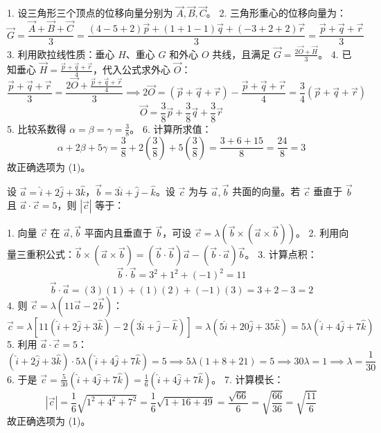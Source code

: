 \begin{questions}
\begin{solution}
1. 设三角形三个顶点的位移向量分别为 $\vec{A}, \vec{B}, \vec{C}$。
2. 三角形重心的位移向量为：
\[
\vec{G} = \frac{\vec{A} + \vec{B} + \vec{C}}{3} = \frac{(4-5+2)\vec{p} + (1+1-1)\vec{q} + (-3+2+2)\vec{r}}{3} = \frac{\vec{p} + \vec{q} + \vec{r}}{3}
\]
3. 利用欧拉线性质：垂心 $H$、重心 $G$ 和外心 $O$ 共线，且满足 $\vec{G} = \frac{2\vec{O} + \vec{H}}{3}$。
4. 已知垂心 $\vec{H} = \frac{\vec{p}+\vec{q}+\vec{r}}{4}$，代入公式求外心 $\vec{O}$：
\[
\frac{\vec{p} + \vec{q} + \vec{r}}{3} = \frac{2\vec{O} + \frac{\vec{p}+\vec{q}+\vec{r}}{4}}{3} \implies 2\vec{O} = (\vec{p}+\vec{q}+\vec{r}) - \frac{\vec{p}+\vec{q}+\vec{r}}{4} = \frac{3}{4}(\vec{p}+\vec{q}+\vec{r})
\]
\[
\vec{O} = \frac{3}{8}\vec{p} + \frac{3}{8}\vec{q} + \frac{3}{8}\vec{r}
\]
5. 比较系数得 $\alpha = \beta = \gamma = \frac{3}{8}$。
6. 计算所求值：
\[
\alpha + 2\beta + 5\gamma = \frac{3}{8} + 2\left(\frac{3}{8}\right) + 5\left(\frac{3}{8}\right) = \frac{3 + 6 + 15}{8} = \frac{24}{8} = 3
\]
故正确选项为 (1)。
\end{solution}

\question
设 $\vec{a} = \hat{i} + 2\hat{j} + 3\hat{k}$，$\vec{b} = 3\hat{i} + \hat{j} - \hat{k}$。设 $\vec{c}$ 为与 $\vec{a}, \vec{b}$ 共面的向量。若 $\vec{c}$ 垂直于 $\vec{b}$ 且 $\vec{a} \cdot \vec{c} = 5$，则 $|\vec{c}|$ 等于：

\begin{solution}
1. 向量 $\vec{c}$ 在 $\vec{a}, \vec{b}$ 平面内且垂直于 $\vec{b}$，可设 $\vec{c} = \lambda (\vec{b} \times (\vec{a} \times \vec{b}))$。
2. 利用向量三重积公式：$\vec{b} \times (\vec{a} \times \vec{b}) = (\vec{b} \cdot \vec{b})\vec{a} - (\vec{b} \cdot \vec{a})\vec{b}$。
3. 计算点积：
\[
\vec{b} \cdot \vec{b} = 3^2 + 1^2 + (-1)^2 = 11
\]
\[
\vec{b} \cdot \vec{a} = (3)(1) + (1)(2) + (-1)(3) = 3 + 2 - 3 = 2
\]
4. 则 $\vec{c} = \lambda (11\vec{a} - 2\vec{b})$：
\[
\vec{c} = \lambda [11(\hat{i} + 2\hat{j} + 3\hat{k}) - 2(3\hat{i} + \hat{j} - \hat{k})] = \lambda (5\hat{i} + 20\hat{j} + 35\hat{k}) = 5\lambda (\hat{i} + 4\hat{j} + 7\hat{k})
\]
5. 利用 $\vec{a} \cdot \vec{c} = 5$：
\[
(\hat{i} + 2\hat{j} + 3\hat{k}) \cdot 5\lambda (\hat{i} + 4\hat{j} + 7\hat{k}) = 5 \implies 5\lambda (1 + 8 + 21) = 5 \implies 30\lambda = 1 \implies \lambda = \frac{1}{30}
\]
6. 于是 $\vec{c} = \frac{5}{30}(\hat{i} + 4\hat{j} + 7\hat{k}) = \frac{1}{6}(\hat{i} + 4\hat{j} + 7\hat{k})$。
7. 计算模长：
\[
|\vec{c}| = \frac{1}{6}\sqrt{1^2 + 4^2 + 7^2} = \frac{1}{6}\sqrt{1 + 16 + 49} = \frac{\sqrt{66}}{6} = \sqrt{\frac{66}{36}} = \sqrt{\frac{11}{6}}
\]
故正确选项为 (1)。
\end{solution}


\end{questions}
